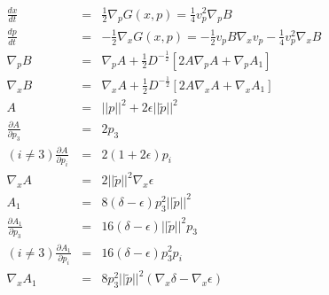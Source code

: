 \documentclass[12pt]{article}
\begin{document}
\begin{eqnarray}
\frac{dx}{dt}   &=&  \frac{1}{2}\nabla_p G(x,p) =  \frac{1}{4}v_p^2\nabla_pB\\
\frac{dp}{dt}   &=& -\frac{1}{2}\nabla_x G(x,p) = -\frac{1}{2}v_pB\nabla_xv_p-\frac{1}{4}v_p^2\nabla_xB\\
\nabla_p B      &=&  \nabla_p A+\frac{1}{2}D^{-\frac{1}{2}}\left[2A\nabla_p A + \nabla_p A_1\right]\\
\nabla_x B      &=&  \nabla_x A+\frac{1}{2}D^{-\frac{1}{2}}\left[2A\nabla_x A + \nabla_x A_1\right]\\
A               &=&  ||p||^2+2\epsilon||\tilde{p}||^2 \\
\frac{\partial A}{\partial p_3} &=& 2p_3\\
(i\neq3)\frac{\partial A}{\partial p_i} &=& 2(1+2\epsilon)p_i\\
\nabla_x A      &=&  2||\tilde{p}||^2\nabla_x \epsilon\\
A_1             &=&  8(\delta-\epsilon)p_3^2||\tilde{p}||^2 \\
\frac{\partial A_1}{\partial p_3} &=& 16(\delta-\epsilon)||\tilde{p}||^2p_3\\
(i\neq3)\frac{\partial A_1}{\partial p_i} &=& 16(\delta-\epsilon)p_3^2p_i\\
\nabla_x A_1    &=&  8p_3^2||\tilde{p}||^2(\nabla_x \delta - \nabla_x \epsilon) \nonumber
\end{eqnarray}
\end{document}
